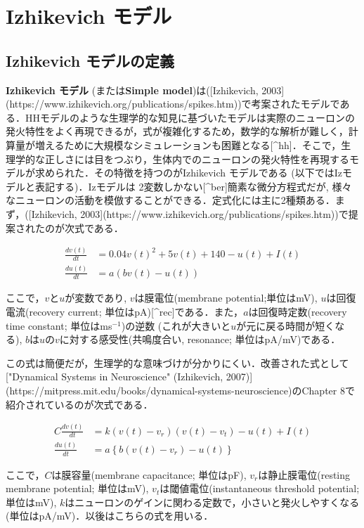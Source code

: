 \section{Izhikevich モデル}
\subsection{Izhikevich モデルの定義}
\textbf{Izhikevich モデル} (または\textbf{Simple model})は([Izhikevich, 2003](https://www.izhikevich.org/publications/spikes.htm))で考案されたモデルである．HHモデルのような生理学的な知見に基づいたモデルは実際のニューロンの発火特性をよく再現できるが，式が複雑化するため，数学的な解析が難しく，計算量が増えるために大規模なシミュレーションも困難となる[^hh]．そこで，生理学的な正しさには目をつぶり，生体内でのニューロンの発火特性を再現するモデルが求められた．その特徴を持つのがIzhikevich モデルである (以下ではIzモデルと表記する)．Izモデルは 2変数しかない[^ber]簡素な微分方程式だが, 様々なニューロンの活動を模倣することができる．定式化には主に2種類ある．まず，([Izhikevich, 2003](https://www.izhikevich.org/publications/spikes.htm))で提案されたのが次式である．


\begin{align}
\frac{dv(t)}{dt}&=0.04v(t)^2 + 5v(t)+140-u(t)+I(t) \\
\frac{du(t)}{dt}&=a(bv(t)-u(t))
\end{align} 


ここで，$v$と$u$が変数であり, $v$は膜電位(membrane potential;単位はmV), $u$は回復電流(recovery current; 単位はpA)[^rec]である．また，$a$は回復時定数(recovery time constant; 単位はms$^{-1}$)の逆数 (これが大きいと$u$が元に戻る時間が短くなる), $b$は$u$の$v$に対する感受性(共鳴度合い,  resonance; 単位はpA/mV)である．

この式は簡便だが，生理学的な意味づけが分かりにくい．改善された式として["Dynamical Systems in Neuroscience" (Izhikevich, 2007)](https://mitpress.mit.edu/books/dynamical-systems-neuroscience)のChapter 8で紹介されているのが次式である．


\begin{align}
C\frac{dv(t)}{dt}&=k\left(v(t)-v_r\right)\left(v(t)-v_t\right)-u(t)+I(t) \\
\frac{du(t)}{dt}&=a\left\{b\left(v(t)-v_{r}\right)-u(t)\right\}
\end{align} 


ここで，$C$は膜容量(membrane capacitance; 単位はpF), $v_r$は静止膜電位(resting membrane potential; 単位はmV), $v_t$は閾値電位(instantaneous threshold potential; 単位はmV), $k$はニューロンのゲインに関わる定数で，小さいと発火しやすくなる (単位はpA/mV)．以後はこちらの式を用いる．


